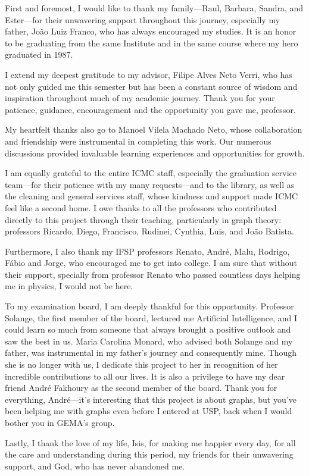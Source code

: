 \begin{agradecimentos}

    First and foremost, I would like to thank my family—Raul, Barbara,
    Sandra, and Ester—for their unwavering support throughout this
    journey, especially my father, João Luiz Franco, who has always
    encouraged my studies. It is an honor to be graduating from the
    same Institute and in the same course where my hero graduated in
    1987.

    I extend my deepest gratitude to my advisor, Filipe Alves Neto
    Verri, who has not only guided me this semester but has been a
    constant source of wisdom and inspiration throughout much of my
    academic journey. Thank you for your patience, guidance,
    encouragement and the opportunity you gave me, professor.

    My heartfelt thanks also go to Manoel Vilela Machado Neto, whose
    collaboration and friendship were instrumental in completing this
    work. Our numerous discussions provided invaluable learning
    experiences and opportunities for growth.

    I am equally grateful to the entire ICMC staff, especially the
    graduation service team—for their patience with my many
    requests—and to the library, as well as the cleaning and general
    services staff, whose kindness and support made ICMC feel like a
    second home. I owe thanks to all the professors who contributed
    directly to this project through their teaching, particularly in
    graph theory: professors Ricardo, Diego, Francisco, Rudinei,
    Cynthia, Luis, and João Batista.

    Furthermore, I also thank my IFSP professors Renato, André, Malu,
    Rodrigo, Fábio and Jorge, who encouraged me to get into college. I
    am sure that without their support, specially from professor
    Renato who passed countless days helping me in physics, I would
    not be here.

    To my examination board, I am deeply thankful for this
    opportunity. Professor Solange, the first member of the board,
    lectured me Artificial Intelligence, and I could learn so much
    from someone that always brought a positive outlook and saw the
    best in us. Maria Carolina Monard, who advised both Solange and my
    father, was instrumental in my father's journey and consequently
    mine. Though she is no longer with us, I dedicate this project to
    her in recognition of her incredible contributions to all our
    lives. It is also a privilege to have my dear friend André
    Fakhoury as the second member of the board. Thank you for
    everything, André—it's interesting that this project is about
    graphs, but you've been helping me with graphs even before I
    entered at USP, back when I would bother you in GEMA's group.

    Lastly, I thank the love of my life, Isis, for making me happier
    every day, for all the care and understanding during this period,
    my friends for their unwavering support, and God, who has never
    abandoned me.

\end{agradecimentos}
